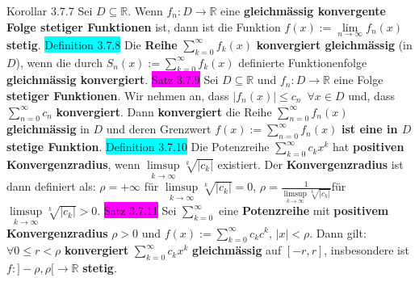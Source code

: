 \documentclass[landscape, 10pt]{article}
\newcommand{\R}{\mathbb{R}}
\begin{document}
\begin{multicols}{3}
\colorbox{BurntOrange}{Korollar 3.7.7} Sei \textcolor{NavyBlue}{$D\subseteq\R$}. Wenn 
                \textcolor{NavyBlue}{$f_n:D\longrightarrow\R$} 
                eine \textbf{gleichmässig konvergente Folge stetiger Funktionen} ist, 
         dann ist die Funktion \textcolor{NavyBlue}{
                $f(x):=\lim\limits_{n\to\infty}f_n(x)$} \textbf{stetig}.
\colorbox{cyan}{Definition 3.7.8} Die \textbf{Reihe}
                \textcolor{NavyBlue}{$\sum_{k=0}^\infty f_k(x)$}
                \textbf{konvergiert gleichmässig} (in $D$), wenn die durch 
                \textcolor{NavyBlue}{$S_n(x):=\sum_{k=0}^\infty f_k(x)$} 
         definierte Funktionenfolge \textbf{gleichmässig konvergiert}.
\colorbox{magenta}{Satz 3.7.9} Sei \textcolor{NavyBlue}{$D\subseteq\R$} und 
                \textcolor{NavyBlue}{$f_n:D\longrightarrow\R$} 
                eine Folge \textbf{stetiger Funktionen}. 
                Wir nehmen an, dass 
         \textcolor{NavyBlue}{$|f_n(x)|\leqslant c_n\enspace\forall x\in D$}
                und, dass \textcolor{NavyBlue}{$\sum_{n=0}^\infty c_n$} \textbf{konvergiert}. 
                Dann \textbf{konvergiert} die Reihe 
                \textcolor{NavyBlue}{$\sum_{n=0}^\infty f_n(x)$} \textbf{gleichmässig} 
         in $D$ und deren 
                Grenzwert \textcolor{NavyBlue}{$f(x):=\sum_{n=0}^\infty f_n(x)$} 
                \textbf{ist eine in $D$ stetige Funktion}.
\colorbox{cyan}{Definition 3.7.10} Die Potenzreihe 
                \textcolor{NavyBlue}{$\sum_{k=0}^\infty c_kx^k$}
                hat \textbf{positiven Konvergenzradius}, wenn 
                \textcolor{NavyBlue}{$\limsup\limits_{k\to\infty}\sqrt[k]{|c_k|}$} 
                existiert. 
         Der \textbf{Konvergenzradius} ist dann definiert als: 
                \textcolor{NavyBlue}{$\rho=+\infty$} \qquad\qquad für
                \textcolor{NavyBlue}{$\limsup\limits_{k\to\infty}\sqrt[k]{|c_k|}=0$},
        \qquad\qquad\qquad\qquad\qquad\qquad\qquad\qquad\enspace\enspace
                \textcolor{NavyBlue}{
                $\rho=\frac{1}{\limsup\limits_{k\to\infty}\sqrt[k]{|c_k|}}$}\quad für
                \textcolor{NavyBlue}{$\limsup\limits_{k\to\infty}\sqrt[k]{|c_k|}>0$}.
\colorbox{magenta}{Satz 3.7.11} Sei \textcolor{NavyBlue}{$\sum_{k=0}^\infty$}
                eine \textbf{Potenzreihe} mit 
                \textbf{positivem Konvergenzradius} 
                \textcolor{NavyBlue}{$\rho>0$} und  
                \textcolor{NavyBlue}{$f(x):=\sum_{k=0}^\infty c_kc^k,\,|x|<\rho$}. 
         Dann gilt: \textcolor{NavyBlue}{$\forall0\leqslant r<\rho$} 
                \textbf{konvergiert} 
                \textcolor{NavyBlue}{$\sum_{k=0}^\infty c_kx^k$} 
                \textbf{gleichmässig} auf \textcolor{NavyBlue}{$[-r,r]$}, insbesondere 
                ist \textcolor{NavyBlue}{$f:]-\rho,\rho[\longrightarrow\R$} 
                \textbf{stetig}.

\end{multicols}
\end{document}
